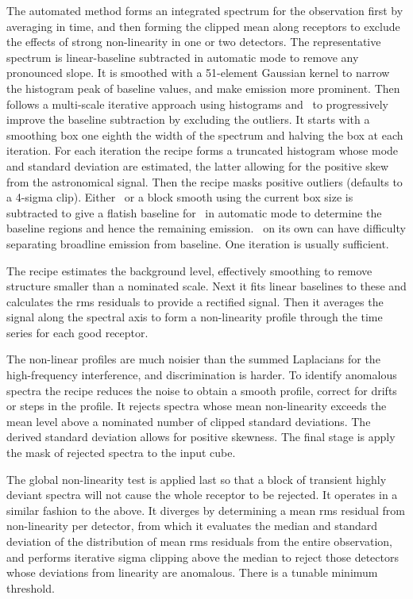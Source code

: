\documentclass[final,authoryear,5p,times,twocolumn]{elsarticle}
\begin{document}
The automated method forms an integrated spectrum for the observation
first by averaging in time, and then forming the clipped mean along
receptors to exclude the effects of strong non-linearity in one or two
detectors.  The representative spectrum is linear-baseline subtracted
in automatic mode to remove any pronounced slope.  It is smoothed with
a 51-element Gaussian kernel to narrow the histogram peak of baseline
values, and make emission more prominent.  Then follows a multi-scale
iterative approach using histograms and \mfittrend\ to progressively
improve the baseline subtraction by excluding the outliers.  It starts
with a smoothing box one eighth the width of the spectrum and halving
the box at each iteration.  For each iteration the recipe forms a
truncated histogram whose mode and standard deviation are estimated,
the latter allowing for the positive skew from the astronomical
signal.  Then the recipe masks positive outliers (defaults to a
4-sigma clip).  Either \findback\ or a block smooth using the current
box size is subtracted to give a flatish baseline for \mfittrend\ in
automatic mode to determine the baseline regions and hence the
remaining emission.  \mfittrend\ on its own can have difficulty
separating broadline emission from baseline.  One iteration is usually
sufficient.

The recipe estimates the background level, effectively smoothing to
remove structure smaller than a nominated scale.  Next it fits linear
baselines to these and calculates the rms residuals to provide a
rectified signal.  Then it averages the signal along the spectral axis
to form a non-linearity profile through the time series for each good
receptor.

The non-linear profiles are much noisier than the summed Laplacians
for the high-frequency interference, and discrimination is harder.  To
identify anomalous spectra the recipe reduces the noise to obtain a
smooth profile, correct for drifts or steps in the profile.  It
rejects spectra whose mean non-linearity exceeds the mean level above
a nominated number of clipped standard deviations.  The derived
standard deviation allows for positive skewness.  The final stage
is apply the mask of rejected spectra to the input cube.

The global non-linearity test is applied last so that a block of
transient highly deviant spectra will not cause the whole receptor to
be rejected.  It operates in a similar fashion to the above.  It
diverges by determining a mean rms residual from non-linearity per
detector, from which it evaluates the median and standard deviation of
the distribution of mean rms residuals from the entire observation,
and performs iterative sigma clipping above the median to reject those
detectors whose deviations from linearity are anomalous.  There is a
tunable minimum threshold.
\end{document}

